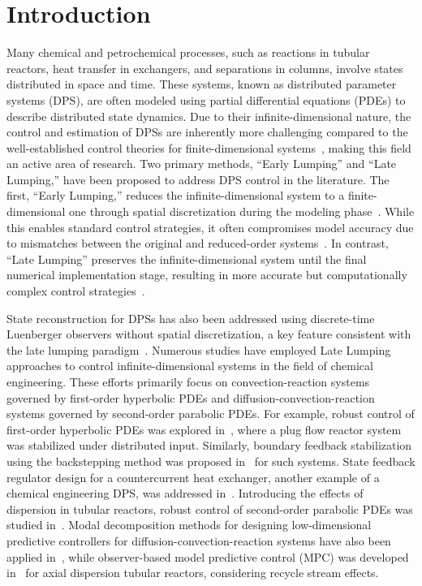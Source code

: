 \section{Introduction}

Many chemical and petrochemical processes, such as reactions in tubular reactors, heat transfer in exchangers, and separations in columns, involve states distributed in space and time. These systems, known as distributed parameter systems (DPS), are often modeled using partial differential equations (PDEs) to describe distributed state dynamics. Due to their infinite-dimensional nature, the control and estimation of DPSs are inherently more challenging compared to the well-established control theories for finite-dimensional systems~\cite{ray1981advanced}, making this field an active area of research. Two primary methods, ``Early Lumping'' and ``Late Lumping,'' have been proposed to address DPS control in the literature. The first, ``Early Lumping,'' reduces the infinite-dimensional system to a finite-dimensional one through spatial discretization during the modeling phase~\cite{davison1976robust}. While this enables standard control strategies, it often compromises model accuracy due to mismatches between the original and reduced-order systems~\cite{moghadam2012infinite}. In contrast, ``Late Lumping'' preserves the infinite-dimensional system until the final numerical implementation stage, resulting in more accurate but computationally complex control strategies~\cite{ray1981advanced}.

State reconstruction for DPSs has also been addressed using discrete-time Luenberger observers without spatial discretization, a key feature consistent with the late lumping paradigm~\cite{dochain2000state,dochain2001state,alonso2004optimal,Ali2015Review}.
Numerous studies have employed Late Lumping approaches to control infinite-dimensional systems in the field of chemical engineering. These efforts primarily focus on convection-reaction systems governed by first-order hyperbolic PDEs and diffusion-convection-reaction systems governed by second-order parabolic PDEs. For example, robust control of first-order hyperbolic PDEs was explored in~\cite{christofides1996feedback}, where a plug flow reactor system was stabilized under distributed input. Similarly, boundary feedback stabilization using the backstepping method was proposed in~\cite{krstic2008backstepping} for such systems. State feedback regulator design for a countercurrent heat exchanger, another example of a chemical engineering DPS, was addressed in~\cite{xu2016state}. Introducing the effects of dispersion in tubular reactors, robust control of second-order parabolic PDEs was studied in~\cite{christofides1998robust}. Modal decomposition methods for designing low-dimensional predictive controllers for diffusion-convection-reaction systems have also been applied in~\cite{dubljevic2006predictive}, while observer-based model predictive control (MPC) was developed in~\cite{Khatibi2021Model} for axial dispersion tubular reactors, considering recycle stream effects.

